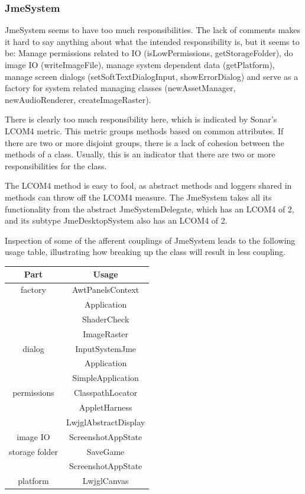 \documentclass[a4paper, 10pt]{article}
\begin{document}
\subsubsection{JmeSystem}
JmeSystem seems to have too much responsibilities.
The lack of comments makes it hard to say anything about what 
the intended responsibility is, but it seems to be:
Manage permissions related to IO 
(isLowPermissions, getStorageFolder),
do image IO (writeImageFile),
manage system dependent data (getPlatform),
manage screen dialogs 
(setSoftTextDialogInput, showErrorDialog) and
serve as a factory for system related managing classes 
(newAssetManager, newAudioRenderer, createImageRaster).

There is clearly too much responsibility here, 
which is indicated by Sonar's LCOM4 metric.
This metric groups methods based on common attributes.
If there are two or more disjoint groups, 
there is a lack of cohesion between the methods of a class.
Usually, this is an indicator that there are two or more 
responsibilities for the class.

The LCOM4 method is easy to fool, as
abstract methods and loggers shared in methods can throw off
the LCOM4 measure.
The JmeSystem takes all its functionality 
from the abstract JmeSystemDelegate, 
which has an LCOM4 of 2,
and its subtype JmeDesktopSystem also has an LCOM4 of 2.

Inspection of some of the afferent couplings of JmeSystem 
leads to the following usage table, 
illustrating how breaking up the class will result in 
less coupling.

\begin{tabular}{|c|c|}
\hline
\textbf{Part}&\textbf{Usage}\\\hline
factory	& AwtPanelsContext\\\hline
		& Application\\\hline
		& ShaderCheck\\\hline
		& ImageRaster\\\hline
dialog	& InputSystemJme\\\hline
		& Application\\\hline
		& SimpleApplication\\\hline
permissions	& ClasspathLocator\\\hline
		& AppletHarness\\\hline
		& LwjglAbstractDisplay\\\hline
image IO	& ScreenshotAppState\\\hline
storage folder	& SaveGame\\\hline
		& ScreenshotAppState\\\hline
platform	& LwjglCanvas\\\hline
\end{tabular}
\end{document}

